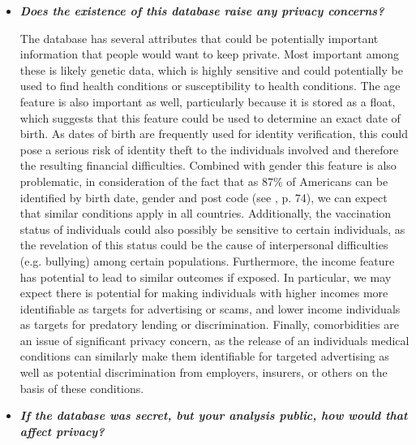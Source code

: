 \documentclass{article}
\begin{document}
\begin{itemize}
\item \textbf{\textit{Does the existence of this database raise any privacy concerns?}}

The database has several attributes that could be potentially important information that people would want to keep private. Most important among these is likely genetic data, which is highly sensitive and could potentially be used to find health conditions or susceptibility to health conditions. The age feature is also important as well, particularly because it is stored as a float, which suggests that this feature could be used to determine an exact date of birth. As dates of birth are frequently used for identity verification, this could pose a serious risk of identity theft to the individuals involved and therefore the resulting financial difficulties. Combined with gender this feature is also problematic, in consideration of the fact that as $87\%$ of Americans can be identified by birth date, gender and post code (see \textcolor{blue}{\cite{Dimitrakakis}}, p. 74), we can expect that similar conditions apply in all countries. Additionally, the vaccination status of individuals could also possibly be sensitive to certain individuals, as the revelation of this status could be the cause of interpersonal difficulties (e.g. bullying) among certain populations.  Furthermore, the income feature has potential to lead to similar outcomes if exposed. In particular, we may expect there is potential for making individuals with higher incomes more identifiable as targets for advertising or scams, and lower income individuals as targets for predatory lending or discrimination. Finally, comorbidities are an issue of significant privacy concern, as the release of an individuals medical conditions can similarly make them identifiable for targeted advertising as well as potential discrimination from employers, insurers, or others on the basis of these conditions.

\item \textbf{\textit{If the database was secret, but your analysis public, how would that affect privacy?}}


\end{itemize}
\end{document}
